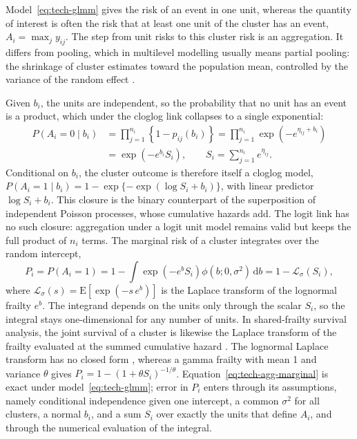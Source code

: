 Model~\eqref{eq:tech-glmm} gives the risk of an event in one unit, whereas the quantity of interest is often the risk that at least one unit of the cluster has an event, $A_i = \max_j y_{ij}$.
The step from unit risks to this cluster risk is an aggregation.
It differs from pooling, which in multilevel modelling usually means partial pooling: the shrinkage of cluster estimates toward the population mean, controlled by the variance of the random effect \cite{gelman2006multilevel}.

Given $b_i$, the units are independent, so the probability that no unit has an event is a product, which under the cloglog link collapses to a single exponential:
\begin{equation}
  \begin{aligned}
  P(A_i = 0 \mid b_i) &= \prod_{j=1}^{n_i} \left\{1 - p_{ij}(b_i)\right\}
  = \prod_{j=1}^{n_i} \exp\!\left(-e^{\eta_{ij} + b_i}\right) \\
  &= \exp\!\left(-e^{b_i} S_i\right),
  \qquad
  S_i = \sum_{j=1}^{n_i} e^{\eta_{ij}} .
  \end{aligned}
  \label{eq:tech-agg-conditional}
\end{equation}
Conditional on $b_i$, the cluster outcome is therefore itself a cloglog model, $P(A_i = 1 \mid b_i) = 1 - \exp\{-\exp(\log S_i + b_i)\}$, with linear predictor $\log S_i + b_i$.
This closure is the binary counterpart of the superposition of independent Poisson processes, whose cumulative hazards add.
The logit link has no such closure: aggregation under a logit unit model remains valid but keeps the full product of $n_i$ terms.
The marginal risk of a cluster integrates over the random intercept,
\begin{equation}
  P_i = P(A_i = 1) = 1 - \int \exp\!\left(-e^{b} S_i\right) \phi(b; 0, \sigma^2)\,\mathrm{d}b
  = 1 - \mathcal{L}_\sigma(S_i),
  \label{eq:tech-agg-marginal}
\end{equation}
where $\mathcal{L}_\sigma(s) = \mathrm{E}[\exp(-s\,e^{b})]$ is the Laplace transform of the lognormal frailty $e^{b}$.
The integrand depends on the units only through the scalar $S_i$, so the integral stays one-dimensional for any number of units.
In shared-frailty survival analysis, the joint survival of a cluster is likewise the Laplace transform of the frailty evaluated at the summed cumulative hazard \cite{duchateau2008frailty}. %
The lognormal Laplace transform has no closed form \cite{asmussen2016laplace}, whereas a gamma frailty with mean 1 and variance $\theta$ gives $P_i = 1 - (1 + \theta S_i)^{-1/\theta}$.
Equation~\eqref{eq:tech-agg-marginal} is exact under model~\eqref{eq:tech-glmm}; error in $P_i$ enters through its assumptions, namely conditional independence given one intercept, a common $\sigma^2$ for all clusters, a normal $b_i$, and a sum $S_i$ over exactly the units that define $A_i$, and through the numerical evaluation of the integral.

